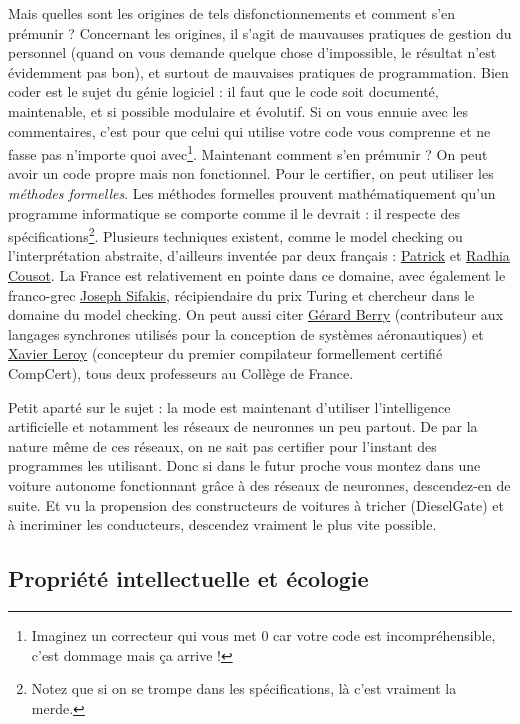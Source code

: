 \documentclass[10pt]{article}
\begin{document}
Mais quelles sont les origines de tels disfonctionnements et comment s'en prémunir ? Concernant les origines, il s'agit de mauvauses pratiques de gestion du
personnel (quand on vous demande quelque chose d'impossible, le résultat n'est évidemment pas bon), et surtout de mauvaises pratiques de programmation.
Bien coder est le sujet du génie logiciel : il faut que le code soit documenté, maintenable, et si possible modulaire et évolutif. Si on vous ennuie
avec les commentaires, c'est pour que celui qui utilise votre code vous comprenne et ne fasse pas n'importe quoi avec\footnote{
  Imaginez un correcteur qui vous met $0$ car votre code est incompréhensible, c'est dommage mais ça arrive !
}. Maintenant comment s'en prémunir ? On peut avoir un code propre mais non fonctionnel. Pour le certifier, on peut utiliser les \emph{méthodes formelles}.
Les méthodes formelles prouvent mathématiquement qu'un programme informatique se comporte comme il le devrait : il respecte des spécifications\footnote{
  Notez que si on se trompe dans les spécifications, là c'est vraiment la merde.}. Plusieurs techniques existent, comme le model checking ou l'interprétation
abstraite, d'ailleurs inventée par deux français : \href{https://fr.wikipedia.org/wiki/Patrick_Cousot}{Patrick} et
\href{https://fr.wikipedia.org/wiki/Radhia_Cousot}{Radhia Cousot}. La France est relativement en pointe dans ce domaine, avec également le franco-grec
\href{https://fr.wikipedia.org/wiki/Joseph_Sifakis}{Joseph Sifakis}, récipiendaire du prix Turing et chercheur dans le domaine du model checking.
On peut aussi citer \href{https://fr.wikipedia.org/wiki/G\%C3\%A9rard_Berry}{Gérard Berry} (contributeur aux langages synchrones utilisés
pour la conception de systèmes aéronautiques) et \href{https://fr.wikipedia.org/wiki/Xavier_Leroy}{Xavier Leroy} (concepteur du premier compilateur
formellement certifié CompCert), tous deux professeurs au Collège de France.

Petit aparté sur le sujet : la mode est maintenant d'utiliser l'intelligence artificielle et notamment les réseaux de neuronnes un peu partout.
De par la nature même de ces réseaux, on ne sait pas certifier pour l'instant des programmes les utilisant. Donc si dans le futur proche vous
montez dans une voiture autonome fonctionnant grâce à des réseaux de neuronnes, descendez-en de suite. Et vu la propension des constructeurs de voitures
à tricher (DieselGate) et à incriminer les conducteurs, descendez vraiment le plus vite possible.



\subsection{Propriété intellectuelle et écologie}
\end{document}
